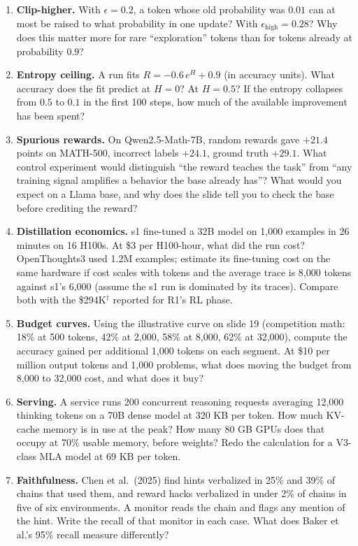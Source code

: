 \documentclass[11pt,letterpaper]{article}
\begin{document}
\begin{enumerate}[leftmargin=1.6em,itemsep=6pt]
\item \textbf{Clip-higher.} With $\epsilon=0.2$, a token whose old probability was $0.01$ can at most be raised to what probability in one update? With $\epsilon_{\text{high}}=0.28$? Why does this matter more for rare ``exploration'' tokens than for tokens already at probability $0.9$?
\item \textbf{Entropy ceiling.} A run fits $R=-0.6\,e^{H}+0.9$ (in accuracy units). What accuracy does the fit predict at $H=0$? At $H=0.5$? If the entropy collapses from $0.5$ to $0.1$ in the first 100 steps, how much of the available improvement has been spent?
\item \textbf{Spurious rewards.} On Qwen2.5-Math-7B, random rewards gave $+21.4$ points on MATH-500, incorrect labels $+24.1$, ground truth $+29.1$. What control experiment would distinguish ``the reward teaches the task'' from ``any training signal amplifies a behavior the base already has''? What would you expect on a Llama base, and why does the slide tell you to check the base before crediting the reward?
\item \textbf{Distillation economics.} s1 fine-tuned a 32B model on 1{,}000 examples in 26 minutes on 16 H100s. At \$3 per H100-hour, what did the run cost? OpenThoughts3 used 1.2M examples; estimate its fine-tuning cost on the same hardware if cost scales with tokens and the average trace is 8{,}000 tokens against s1's 6{,}000 (assume the s1 run is dominated by its traces). Compare both with the \$294K$^\dagger$ reported for R1's RL phase.
\item \textbf{Budget curves.} Using the illustrative curve on slide 19 (competition math: 18\% at 500 tokens, 42\% at 2{,}000, 58\% at 8{,}000, 62\% at 32{,}000), compute the accuracy gained per additional 1{,}000 tokens on each segment. At \$10 per million output tokens and 1{,}000 problems, what does moving the budget from 8{,}000 to 32{,}000 cost, and what does it buy?
\item \textbf{Serving.} A service runs 200 concurrent reasoning requests averaging 12{,}000 thinking tokens on a 70B dense model at 320 KB per token. How much KV-cache memory is in use at the peak? How many 80 GB GPUs does that occupy at 70\% usable memory, before weights? Redo the calculation for a V3-class MLA model at 69 KB per token.
\item \textbf{Faithfulness.} Chen et al.\ (2025) find hints verbalized in 25\% and 39\% of chains that used them, and reward hacks verbalized in under 2\% of chains in five of six environments. A monitor reads the chain and flags any mention of the hint. Write the recall of that monitor in each case. What does Baker et al.'s 95\% recall measure differently?

\end{enumerate}
\end{document}
